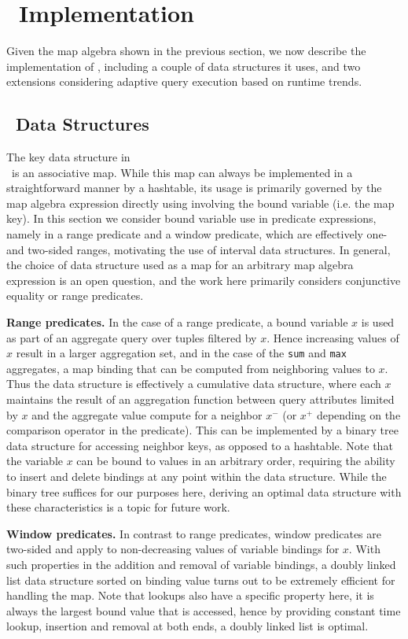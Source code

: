 \section{\compiler\ Implementation}
Given the map algebra shown in the previous section, we now describe
the implementation of \compiler, including a couple of data structures it
uses, and two extensions considering adaptive query execution based on runtime
trends.

\subsection{\compiler\ Data Structures}
The key data structure in\\\compiler\ is an
associative map.
While this map can
always be implemented in a straightforward manner by a hashtable, its usage is
primarily governed by the map algebra expression directly using involving the
bound variable (i.e. the map key). In this section we consider bound
variable use in predicate expressions, namely in a range predicate and a window
predicate, which are effectively one- and two-sided ranges, motivating the use
of interval data structures. In general, the choice of data structure used as a
map for an arbitrary map algebra expression is an open question, and the work
here primarily considers conjunctive equality or range predicates.

\textbf{Range predicates.}
In the case of a range predicate, a bound variable $x$ is used as part of an
aggregate query over tuples filtered by $x$. Hence increasing values of $x$
result in a larger aggregation set, and in the case of the \texttt{sum} and
\texttt{max} aggregates, a map binding that can be computed from neighboring
values to $x$. Thus the data structure is effectively a cumulative data
structure, where each $x$ maintains the result of an aggregation function between
query attributes limited by $x$ and the aggregate value compute for a neighbor
$x^-$ (or $x^+$ depending on the comparison operator in the predicate). This can
be implemented by a binary tree data structure for accessing neighbor keys, as
opposed to a hashtable. Note that the variable $x$ can be bound to values in an
arbitrary order, requiring the ability to insert and delete bindings at any point
within the data structure. While the binary tree suffices for our purposes here,
deriving an optimal data structure with these characteristics is a topic for
future work.

\textbf{Window predicates.}
In contrast to range predicates, window predicates are two-sided and apply to
non-decreasing values of variable bindings for $x$. With such properties in the
addition and removal of variable bindings, a doubly linked list data structure
sorted on binding value turns out to be extremely efficient for handling the map. Note
that lookups also have a specific property here, it is always the largest bound
value that is accessed, hence by providing constant time lookup, insertion and
removal at both ends, a doubly linked list is optimal.




